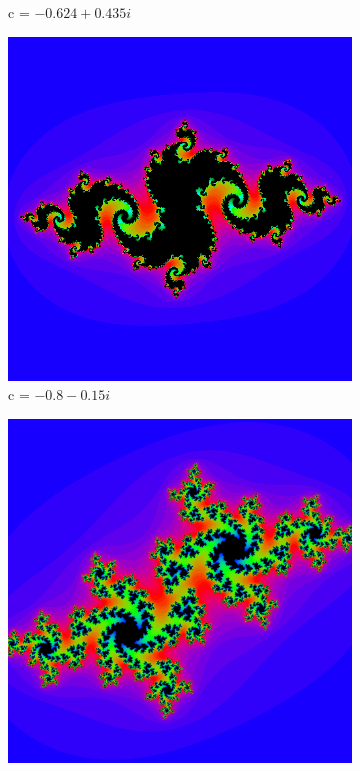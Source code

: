 \documentclass[a4wide, 10pt]{article}
\begin{document}
\begin{figure}[H]
\begin{subfigure}[b]{0.23\textwidth}
                \caption{c = $-0.624+0.435i$}
                \label{fig:c=-0.624+0.435i}
        \end{subfigure}       
        \begin{subfigure}[b]{0.23\textwidth}
                \includegraphics[width=\textwidth]{JuliaSets/julia3.png}
                \caption{c = $-0.8-0.15i$}
                \label{fig:c=-0.8-0.15i}
        \end{subfigure}        
        \begin{subfigure}[b]{0.23\textwidth}
                \includegraphics[width=\textwidth]{JuliaSets/julia4.png}

\end{subfigure}
\end{figure}
\end{document}
